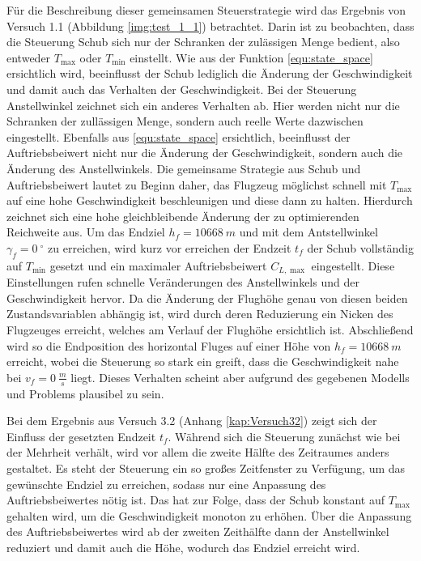 Für die Beschreibung dieser gemeinsamen Steuerstrategie wird das Ergebnis von Versuch 1.1 (Abbildung \ref{img:test_1_1}) betrachtet. Darin ist zu beobachten, dass die Steuerung Schub sich nur der Schranken der zulässigen Menge bedient, also entweder $T_{\max}$ oder $T_{\min}$ einstellt. Wie aus der Funktion \ref{equ:state_space} ersichtlich wird, beeinflusst der Schub lediglich die Änderung der Geschwindigkeit und damit auch das Verhalten der Geschwindigkeit. Bei der Steuerung Anstellwinkel zeichnet sich ein anderes Verhalten ab. Hier werden nicht nur die Schranken der zullässigen Menge, sondern auch reelle Werte dazwischen eingestellt. Ebenfalls aus \ref{equ:state_space} ersichtlich, beeinflusst der Auftriebsbeiwert nicht nur die Änderung der Geschwindigkeit, sondern auch die Änderung des Anstellwinkels. Die gemeinsame Strategie aus Schub und Auftriebsbeiwert lautet zu Beginn daher, das Flugzeug möglichst schnell mit $T_{\max}$ auf eine hohe Geschwindigkeit beschleunigen und diese dann zu halten. Hierdurch zeichnet sich eine hohe gleichbleibende Änderung der zu optimierenden Reichweite aus. Um das Endziel $h_f = 10668 \ m$ und mit dem Antstellwinkel $\gamma_f = 0 \ ^\circ$ zu erreichen, wird kurz vor erreichen der Endzeit $t_f$ der Schub vollständig auf $T_{\min}$ gesetzt und ein maximaler Auftriebsbeiwert $C_{L, \max}$ eingestellt. Diese Einstellungen rufen schnelle Veränderungen des Anstellwinkels und der Geschwindigkeit hervor. Da die Änderung der Flughöhe genau von diesen beiden Zustandsvariablen abhängig ist, wird durch deren Reduzierung ein Nicken des Flugzeuges erreicht, welches am Verlauf der Flughöhe ersichtlich ist. Abschließend wird so die Endposition des horizontal Fluges auf einer Höhe von $h_f = 10668 \ m$ erreicht, wobei die Steuerung so stark ein greift, dass die Geschwindigkeit nahe bei $v_f = 0 \ \frac{m}{s}$ liegt. Dieses Verhalten scheint aber aufgrund des gegebenen Modells und Problems plausibel zu sein.

Bei dem Ergebnis aus Versuch 3.2 (Anhang \ref{kap:Versuch32}) zeigt sich der Einfluss der gesetzten Endzeit $t_f$. Während sich die Steuerung zunächst wie bei der Mehrheit verhält, wird vor allem die zweite Hälfte des Zeitraumes anders gestaltet. Es steht der Steuerung ein so großes Zeitfenster zu Verfügung, um das gewünschte Endziel zu erreichen, sodass nur eine Anpassung des Auftriebsbeiwertes nötig ist. Das hat zur Folge, dass der Schub konstant auf $T_{\max}$ gehalten wird, um die Geschwindigkeit monoton zu erhöhen. Über die Anpassung des Auftriebsbeiwertes wird ab der zweiten Zeithälfte dann der Anstellwinkel reduziert und damit auch die Höhe, wodurch das Endziel erreicht wird.

